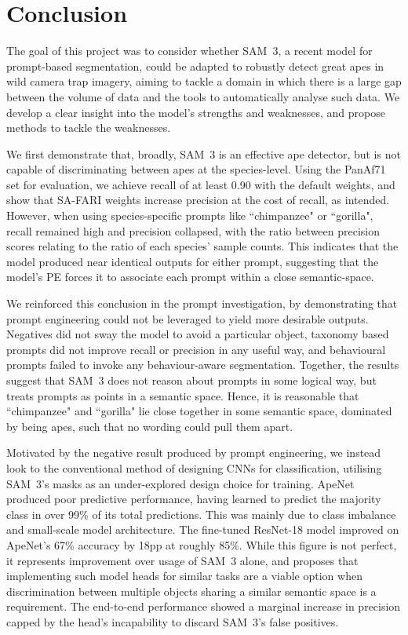 \documentclass[author={Jacob Stephenson},
    degree={BSc},
    title={Robust Great Ape Species Detection in Wild Camera Trap Imagery with Promptable Concept Segmentation},
    unit={COMS30045},
    subtitle={}]{dissertation}
\begin{document}

\chapter{Conclusion}
\label{chap:conclusion}

The goal of this project was to consider whether SAM~3, a recent model for prompt-based segmentation, could be adapted to robustly detect great apes in wild camera trap imagery, aiming to tackle a domain in which there is a large gap between the volume of data and the tools to automatically analyse such data. We develop a clear insight into the model's strengths and weaknesses, and propose methods to tackle the weaknesses.

We first demonstrate that, broadly, SAM~3 is an effective ape detector, but is not capable of discriminating between apes at the species-level. Using the PanAf71 set for evaluation, we achieve recall of at least 0.90 with the default weights, and show that SA-FARI weights increase precision at the cost of recall, as intended. However, when using species-specific prompts like ``chimpanzee" or ``gorilla", recall remained high and precision collapsed, with the ratio between precision scores relating to the ratio of each species' sample counts. This indicates that the model produced near identical outputs for either prompt, suggesting that the model's PE forces it to associate each prompt within a close semantic-space.

We reinforced this conclusion in the prompt investigation, by demonstrating that prompt engineering could not be leveraged to yield more desirable outputs. Negatives did not sway the model to avoid a particular object, taxonomy based prompts did not improve recall or precision in any useful way, and behavioural prompts failed to invoke any behaviour-aware segmentation. Together, the results suggest that SAM~3 does not reason about prompts in some logical way, but treats prompts as points in a semantic space. Hence, it is reasonable that ``chimpanzee" and ``gorilla" lie close together in some semantic space, dominated by being apes, such that no wording could pull them apart.

Motivated by the negative result produced by prompt engineering, we instead look to the conventional method of designing CNNs for classification, utilising SAM~3's masks as an under-explored design choice for training. ApeNet produced poor predictive performance, having learned to predict the majority class in over 99\% of its total predictions. This was mainly due to class imbalance and small-scale model architecture. The fine-tuned ResNet-18 model improved on ApeNet's 67\% accuracy by 18pp at roughly 85\%. While this figure is not perfect, it represents improvement over usage of SAM~3 alone, and proposes that implementing such model heads for similar tasks are a viable option when discrimination between multiple objects sharing a similar semantic space is a requirement. The end-to-end performance showed a marginal increase in precision capped by the head's incapability to discard SAM~3's false positives.
\end{document}
